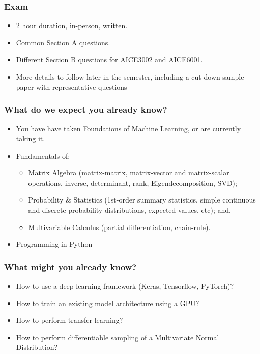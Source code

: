 \documentclass[]{article}
\begin{document}
\begin{frame}
	\frametitle{Exam}

	\begin{itemize}
		\item 2 hour duration, in-person, written.
		\item Common Section A questions.
		\item Different Section B questions for AICE3002 and AICE6001.
		\item More details to follow later in the semester, including a cut-down sample paper with representative questions
	\end{itemize}
\end{frame}

\begin{frame}
	\frametitle{What do we expect you already know?}

	\begin{itemize}
	\item<+-> You have have taken Foundations of Machine Learning, or are currently taking it.
	\item<+-> Fundamentals of:
	\begin{itemize}
		\item Matrix Algebra (matrix-matrix, matrix-vector and matrix-scalar operations, inverse, determinant, rank, Eigendecomposition, SVD);
		\item Probability \& Statistics (1st-order summary statistics, simple continuous and discrete probability distributions, expected values, etc); and,
		\item Multivariable Calculus (partial differentiation, chain-rule).
	\end{itemize}
	\item<+-> Programming in Python
	\end{itemize}
\end{frame}

\begin{frame}
	\frametitle{What might you already know?}
	\begin{itemize}
	\item<+-> How to use a deep learning framework (Keras, Tensorflow, PyTorch)?
	\item<+-> How to train an existing model architecture using a GPU?
	\item<+-> How to perform transfer learning?
	\item<+-> How to perform differentiable sampling of a Multivariate Normal Distribution?
	\end{itemize}
\end{frame}
\end{document}
